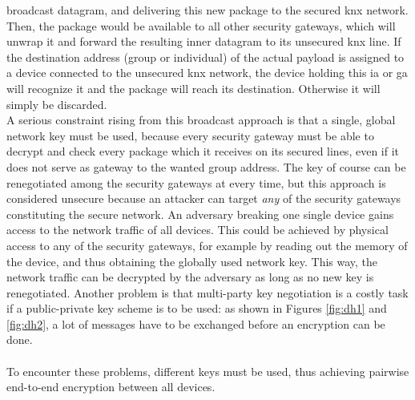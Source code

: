 broadcast datagram, and delivering this new package to the secured \gls{knx} network. Then, the package would be available to all other security gateways, which
will unwrap it and forward the resulting inner datagram to its unsecured \gls{knx} line. If the destination address (group or individual) of the actual payload
is assigned to a device connected
to the unsecured \gls{knx} network, the device holding this \gls{ia} or \gls{ga} will recognize it and the package will reach its destination. 
Otherwise it will simply be discarded.
\\
A serious constraint rising from this broadcast approach is that a single,
global network key must be used, because every security gateway must be able to decrypt and check every package which it receives on its secured lines,
even if it does not serve as gateway to the wanted group address. 
The key of course can be renegotiated among the security gateways at every time, but this approach is considered
unsecure because an attacker can target \textit{any} of the security gateways constituting the secure network. An adversary breaking one single device gains
access to the network traffic of all devices. This could be achieved by physical access to any of the security gateways, for example by reading out the
memory of the device, and thus obtaining the globally used network key. This way, the network traffic can be decrypted by the adversary as long as no new
key is renegotiated. Another problem is that multi-party key negotiation is a costly task if a public-private key scheme
is to be used: as shown in Figures \ref{fig:dh1} and \ref{fig:dh2}, a lot of messages have to be exchanged before an encryption can be done. 
\\
\\
To encounter these problems, different keys must be used, thus achieving pairwise end-to-end encryption between all devices. 

